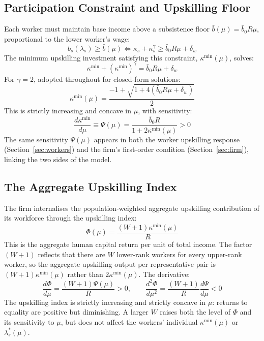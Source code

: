 \documentclass[12pt,a4paper]{article}
\begin{document}
\subsection{Participation Constraint and Upskilling Floor}

Each worker must maintain base income above a subsistence floor
$\bar{b}(\mu) = \bar{b}_0 R\mu$, proportional to the lower worker's
wage:
\begin{equation}
  b_s(\lambda_s) \geq \bar{b}(\mu)
  \iff
  \kappa_s + \kappa_s^\gamma \geq \bar{b}_0 R\mu + \delta_w
  \label{eq:pc}
\end{equation}
The minimum upskilling investment satisfying this constraint,
$\kappa^{\min}(\mu)$, solves:
\begin{equation}
  \kappa^{\min} + \left(\kappa^{\min}\right)^\gamma
  = \bar{b}_0 R\mu + \delta_w
  \label{eq:kappa_min}
\end{equation}
For $\gamma = 2$, adopted throughout for closed-form solutions:
\begin{equation}
  \kappa^{\min}(\mu) =
  \frac{-1 + \sqrt{1 + 4(\bar{b}_0 R\mu + \delta_w)}}{2}
  \label{eq:kappa_min_gamma2}
\end{equation}
This is strictly increasing and concave in $\mu$, with sensitivity:
\begin{equation}
  \frac{d\kappa^{\min}}{d\mu} \equiv \Psi(\mu)
  = \frac{\bar{b}_0 R}{1 + 2\kappa^{\min}(\mu)} > 0
  \label{eq:dkdmu}
\end{equation}
The same sensitivity $\Psi(\mu)$ appears in both the worker upskilling
response (Section~\ref{sec:workers}) and the firm's first-order condition
(Section~\ref{sec:firm}), linking the two sides of the model.

\subsection{The Aggregate Upskilling Index}

The firm internalises the population-weighted aggregate upskilling
contribution of its workforce through the upskilling index:
\begin{equation}
  \Phi(\mu) = \frac{(W+1)\kappa^{\min}(\mu)}{R}
  \label{eq:Phi}
\end{equation}
This is the aggregate human capital return per unit of total income.
The factor $(W+1)$ reflects that there are $W$ lower-rank workers
for every upper-rank worker, so the aggregate upskilling output
per representative pair is $(W+1)\kappa^{\min}(\mu)$ rather than
$2\kappa^{\min}(\mu)$. The derivative:
\begin{equation}
  \frac{d\Phi}{d\mu} = \frac{(W+1)\Psi(\mu)}{R} > 0,
  \qquad
  \frac{d^2\Phi}{d\mu^2} = \frac{(W+1)}{R}\frac{d\Psi}{d\mu} < 0
  \label{eq:Phi_derivs}
\end{equation}
The upskilling index is strictly increasing and strictly concave in $\mu$:
returns to equality are positive but diminishing. A larger $W$ raises
both the level of $\Phi$ and its sensitivity to $\mu$, but does not
affect the workers' individual $\kappa^{\min}(\mu)$ or $\lambda_s^*(\mu)$.
\end{document}
